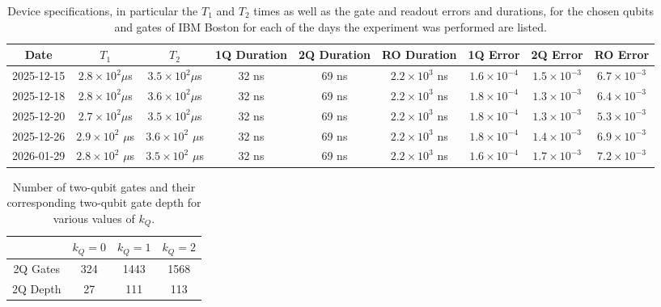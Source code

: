 \documentclass[
  reprint,            %
  amsmath,amssymb,
  aps,
  superscriptaddress, %
  longbibliography
]{revtex4-2}
\theoremstyle{definition}
\begin{document}
\begin{table}[]
    \centering
    \begin{tabular}{|c|c|c|c|c|c|c|c|c|}
     \hline
         Date & $T_1$ & $T_2$  & 1Q Duration & 2Q Duration & RO Duration & 1Q Error  & 2Q Error  & RO Error \\
          \hline
2025-12-15 & $2.8  \times  10^{2} \mu$s & $3.5  \times  10^{2} \mu$s & 32 ns & 69 ns & $2.2  \times  10^{3}$ ns & $1.6  \times  10^{-4}$  & $1.5  \times  10^{-3}$  & $6.7  \times  10^{-3}$  \\
2025-12-18 & $2.8  \times  10^{2} \mu$s & $3.6  \times  10^{2} \mu$s & 32 ns & 69 ns & $2.2  \times  10^{3}$ ns & $1.8  \times  10^{-4}$  & $1.3  \times  10^{-3}$  & $6.4  \times  10^{-3}$  \\
2025-12-20 & $2.7  \times  10^{2} \mu$s & $3.5  \times  10^{2} \mu$s & 32 ns & 69 ns & $2.2  \times  10^{3}$ ns & $1.8  \times  10^{-4}$  & $1.3  \times  10^{-3}$  & $5.3  \times  10^{-3}$  \\
 2025-12-26 & $2.9  \times  10^{2}$ $\mu$s & $3.6  \times  10^{2}$ $\mu$s & 32 ns & 69 ns & $2.2  \times  10^{3}$ ns  & $1.8  \times  10^{-4}$  & $1.4  \times  10^{-3}$  & $6.9  \times  10^{-3}$ \\ 
 2026-01-29 & $2.8  \times  10^{2}$  $\mu$s & $3.5  \times  10^{2}$ $\mu$s & 32 ns & 69 ns & $2.2  \times  10^{3}$ ns & $1.6  \times  10^{-4}$  & $1.7  \times  10^{-3}$  & $7.2  \times  10^{-3}$  \\
  \hline
    \end{tabular}
    \caption{Device specifications, in particular the $T_1$ and $T_2$ times as well as the gate and readout errors and durations, for the chosen qubits and gates of IBM Boston for each of the days the experiment was performed are listed.}
    \label{tab:backend_details}
\end{table}


\begin{table}[]
    \centering
    \begin{tabular}{|c|c|c|c|}
     \hline
& $k_Q = 0$ & $k_Q = 1$ & $k_Q = 2$ \\
\hline
2Q Gates & 324 & 1443 & 1568\\
2Q Depth & 27 & 111 &  113 \\
\hline
    \end{tabular}
    \caption{Number of two-qubit gates and their corresponding two-qubit gate depth for various values of $k_Q$.}
    \label{tab:2qdepth}
\end{table}
\end{document}
